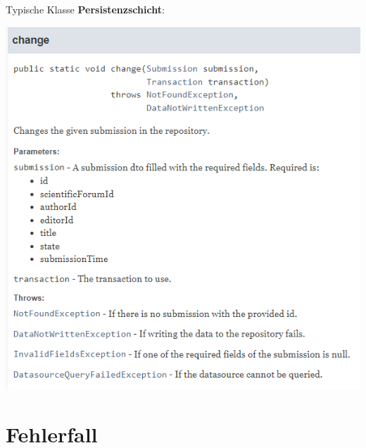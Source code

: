 \documentclass{beamer}
\begin{document}
\begin{frame}{Typische Klasse \textbf{Persistenzschicht}:}
\begin{itemize}
            \includegraphics[height=1.1\textheight]{graphics/repo/doc_change}

        \end{itemize}
    \end{frame}


    \section{Fehlerfall}
\end{document}
